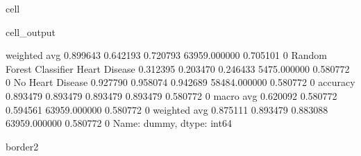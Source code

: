 \documentclass[letterpaper,10pt,english]{jupyterBook}
\begin{document}
\begin{sphinxuseclass}{cell}
\begin{sphinxVerbatimOutput}
\begin{sphinxuseclass}{cell_output}
\begin{sphinxVerbatim}[commandchars=\\\{\}]
                           weighted avg      0.899643   0.642193  0.720793  63959.000000  0.705101    0
Random Forest Classifier   Heart Disease     0.312395   0.203470  0.246433  5475.000000   0.580772    0
                           No Heart Disease  0.927790   0.958074  0.942689  58484.000000  0.580772    0
                           accuracy          0.893479   0.893479  0.893479  0.893479      0.580772    0
                           macro avg         0.620092   0.580772  0.594561  63959.000000  0.580772    0
                           weighted avg      0.875111   0.893479  0.883088  63959.000000  0.580772    0
Name: dummy, dtype: int64

border2
\PYGZhy{}\PYGZhy{}\PYGZhy{}\PYGZhy{}\PYGZhy{}\PYGZhy{}\PYGZhy{}\PYGZhy{}\PYGZhy{}\PYGZhy{}\PYGZhy{}\PYGZhy{}\PYGZhy{}\PYGZhy{}\PYGZhy{}\PYGZhy{}\PYGZhy{}\PYGZhy{}\PYGZhy{}
\end{sphinxVerbatim}

\noindent{}


\end{sphinxuseclass}
\end{sphinxVerbatimOutput}
\end{sphinxuseclass}
\end{document}
